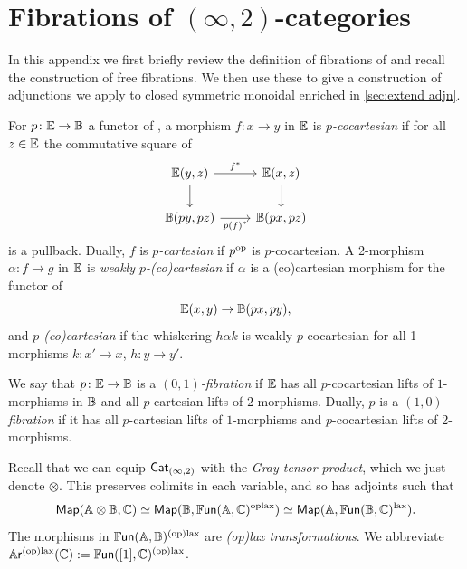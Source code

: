 \documentclass[a4paper,11pt]{article}
\begin{document}
\appendix

\section{Fibrations of $(\infty,2)$-categories}\label{app:fibs}
In this appendix we first briefly review the definition of fibrations
of \itcats{} and recall the construction of free fibrations. We then
use these to give a construction of adjunctions we apply to
closed symmetric monoidal enriched \icats{} in \cref{sec:extend adjn}.
\begin{defn}
  For $p \colon \tE \to \tB$ a functor of \itcats{}, a morphism $f
  \colon x \to y$ in $\mathbb{E}$ is \emph{$p$-cocartesian} if for all $z
  \in \mathbb{E}$ the commutative square of \icats{}
  \[
    \begin{tikzcd}
     \tE(y,z) \ar[r, "f^{*}"] \ar[d] & \tE(x,z)  \ar[d] \\
     \tB(py,pz) \ar[r, "p(f)^{*}"'] & \tB(px,pz)
    \end{tikzcd}
  \]
  is a pullback. Dually, $f$ is \emph{$p$-cartesian} if $p^{\text{\textup{op}}}$ is
  $p$-cocartesian.
  A 2-morphism $\alpha \colon f \to g$ in $\mathbb{E}$ is
  \emph{weakly $p$-(co)cartesian} if $\alpha$ is a (co)cartesian
  morphism for the functor of \icats{}
  \[ \tE(x,y) \to \tB(px,py),\]
  and \emph{$p$-(co)cartesian} if the whiskering $h \alpha k$ is
  weakly $p$-cocartesian for all 1-morphisms $k \colon x' \to x$, $h
  \colon y \to y'$.
\end{defn}

\begin{defn}\label{def:01fib}
  We say that $p \colon \tE \to \tB$ is a \emph{$(0,1)$-fibration} if
  $\mathbb{E}$ has all $p$-cocartesian lifts of $1$-morphisms in $\mathbb{B}$ and
  all $p$-cartesian lifts of $2$-morphisms. Dually, $p$ is a
  \emph{$(1,0)$-fibration} if it has all $p$-cartesian lifts of
  $1$-morphisms and $p$-cocartesian lifts of 2-morphisms.
\end{defn}


\begin{notation}
  Recall that we can equip $\textup{\textsf{Cat}}_{(\infty,2)}$ with the \emph{Gray tensor
    product}, which we just denote $\otimes$.
  This preserves colimits in each variable, and
  so has adjoints such that
  \[ \textup{\textsf{Map}}(\mathbb{A} \otimes \mathbb{B}, \mathbb{C}) \simeq \textup{\textsf{Map}}(\mathbb{B}, \mathbb{F}\mkern-0.5mu\textsf{\textup{un}}(\mathbb{A},
    \mathbb{C})^{\text{\textup{oplax}}}) \simeq \textup{\textsf{Map}}(\mathbb{A}, \mathbb{F}\mkern-0.5mu\textsf{\textup{un}}(\mathbb{B}, \mathbb{C})^{\text{\textup{lax}}}).\]
  The morphisms in $\mathbb{F}\mkern-0.5mu\textsf{\textup{un}}(\mathbb{A},\mathbb{B})^{\text{\textup{(op)lax}}}$ are \emph{(op)lax
    transformations}. We abbreviate $\mathbb{A}\mkern-0.5mu\textsf{\textup{r}}^{\text{\textup{(op)lax}}}(\mathbb{C}) := \mathbb{F}\mkern-0.5mu\textsf{\textup{un}}([1],
  \mathbb{C})^{\text{\textup{(op)lax}}}$.
\end{notation}
\end{document}

